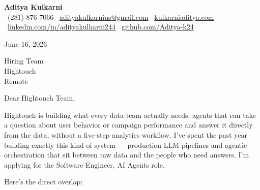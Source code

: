 \documentclass[11pt]{article}
\begin{document}
\begin{center}
  {\LARGE \textbf{Aditya Kulkarni}} \\[4pt]
  \small
  \faPhone\ (281)-876-7066 \quad
  \faEnvelope\ \href{mailto:adityakulkarnius@gmail.com}{adityakulkarnius@gmail.com} \quad
  \faGlobe\ \href{https://www.kulkarniaditya.com}{kulkarniaditya.com} \quad
  \faLinkedin\ \href{https://www.linkedin.com/in/adityakulkarni244/}{linkedin.com/in/adityakulkarni244} \quad
  \faGithub\ \href{https://github.com/Aditya-k24}{github.com/Aditya-k24}
\end{center}

\vspace{6pt}

June 16, 2026

\vspace{6pt}

Hiring Team \\
Hightouch \\
Remote

\vspace{10pt}

Dear Hightouch Team,

\vspace{6pt}

Hightouch is building what every data team actually needs: agents that can take a question about user behavior or campaign performance and answer it directly from the data, without a five-step analytics workflow. I've spent the past year building exactly this kind of system — production LLM pipelines and agentic orchestration that sit between raw data and the people who need answers. I'm applying for the Software Engineer, AI Agents role.

\vspace{8pt}

Here's the direct overlap:
\end{document}
